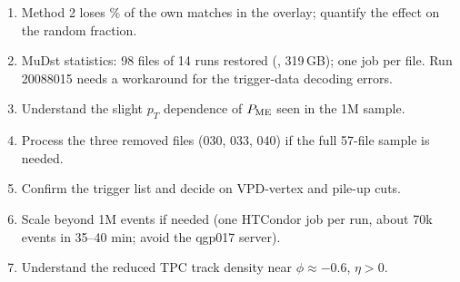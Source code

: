 \begin{enumerate}
  0.2--0.4\,GeV/$c$ (\cddpAllA\%).
\item Method 2 loses \ovbigSElose\% of the own matches in the overlay; quantify the effect on the random fraction.
\item MuDst statistics: 98 files of 14 runs restored (, 319\,GB); one job per file.
  Run 20088015 needs a workaround for the trigger-data decoding errors.
\item Understand the slight $p_T$ dependence of $P_{\rm ME}$ seen in the 1M sample.
\item Process the three removed files (030, 033, 040) if the full 57-file sample is needed.
\item [decision] Confirm the trigger list and decide on VPD-vertex and pile-up cuts.
\item Scale beyond 1M events if needed (one HTCondor job per run, about 70k events in 35--40 min; avoid the qgp017 server).
\item Understand the reduced TPC track density near $\phi\approx-0.6$, $\eta>0$.
\end{enumerate}
